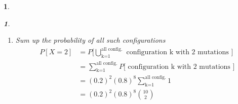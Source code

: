 \documentclass[11pt]{article}
\newtheorem*{solution}{\framebox{Sol}}
\newtheorem{example}{\framebox{Ex}}[section]
\begin{document}
\begin{example}
\begin{enumerate}
\begin{solution}
\begin{enumerate}
\begin{align*}
                                            (M_1, M_2, M_3^c,...., M_{10}^c)    &= M_1 \cap M_2 \cap M_3^c \cap ... \cap M_{10}^c \\
                                            P(M_1, M_2, M_3^c,...., M_{10}^c)   &= P(M_1)P(M_2)P(M_3^c)...P(M_{10}^c) \tag{Rough independenc (large 'city' - small sample)} \\
                                                                                &= 0.2* 0.2* 0.8*...*0.8
                                        \end{align*}
                                        Now notice, all configurations which result in exactly two mutations will have probability $(0.2)^2(0.8)^8$
                                \item Sum up the probability of all such configurations
                                        \begin{align*}
                                            P[X=2]  &= P \Big[\bigcup_{\text{k=1}}^{\text{all config.}} \text{ configuration k with 2 mutations }\Big] \\
                                                    &=\sum_{\text{k=1}}^{\text{all config.}} P \Big[ \text{ configuration k with 2 mutations }\Big] \tag{Ax 3. (config. disjoint)}\\
                                                    &= (0.2)^2(0.8)^8 \sum_{\text{k=1}}^{\text{all config.}} 1 \\
                                                    &= (0.2)^2(0.8)^8 \binom{10}{2}
                                        \end{align*}
                            \end{enumerate}
                            

\end{solution}
\end{enumerate}
\end{example}
\end{document}

